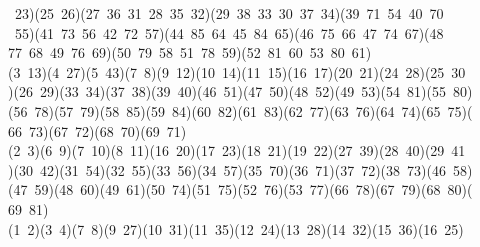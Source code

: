 \begin{tabbing}
\ 23)(25\ 26)(27\ 36\ 31\ 28\ 35\ 32)(29\ 38\ 33\ 30\ 37\ 34)(39\ 71\ 54\ 40\ 70\\[0pt]
\ 55)(41\ 73\ 56\ 42\ 72\ 57)(44\ 85\ 64\ 45\ 84\ 65)(46\ 75\ 66\ 47\ 74\ 67)(48\ \\[0pt]
77\ 68\ 49\ 76\ 69)(50\ 79\ 58\ 51\ 78\ 59)(52\ 81\ 60\ 53\ 80\ 61)\ \\[0pt]
(3\ 13)(4\ 27)(5\ 43)(7\ 8)(9\ 12)(10\ 14)(11\ 15)(16\ 17)(20\ 21)(24\ 28)(25\ 30\\[0pt]
)(26\ 29)(33\ 34)(37\ 38)(39\ 40)(46\ 51)(47\ 50)(48\ 52)(49\ 53)(54\ 81)(55\ 80)\\[0pt]
(56\ 78)(57\ 79)(58\ 85)(59\ 84)(60\ 82)(61\ 83)(62\ 77)(63\ 76)(64\ 74)(65\ 75)(\\[0pt]
66\ 73)(67\ 72)(68\ 70)(69\ 71)\ \\[0pt]
(2\ 3)(6\ 9)(7\ 10)(8\ 11)(16\ 20)(17\ 23)(18\ 21)(19\ 22)(27\ 39)(28\ 40)(29\ 41\\[0pt]
)(30\ 42)(31\ 54)(32\ 55)(33\ 56)(34\ 57)(35\ 70)(36\ 71)(37\ 72)(38\ 73)(46\ 58)\\[0pt]
(47\ 59)(48\ 60)(49\ 61)(50\ 74)(51\ 75)(52\ 76)(53\ 77)(66\ 78)(67\ 79)(68\ 80)(\\[0pt]
69\ 81)\ \\[0pt]
(1\ 2)(3\ 4)(7\ 8)(9\ 27)(10\ 31)(11\ 35)(12\ 24)(13\ 28)(14\ 32)(15\ 36)(16\ 25)\\[0pt]

\end{tabbing}
